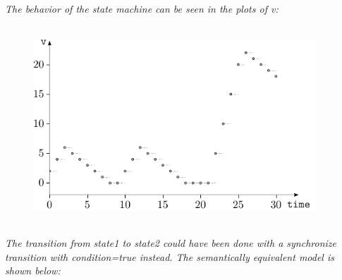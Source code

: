 \documentclass[10pt,a4paper]{report}
\begin{document}
\emph{The behavior of the state machine can be seen in the plots of v:}
\begin{figure}
\includegraphics[width=4.16667in,height=2.91667in]{media/statemachineplot}
\end{figure}
\emph{The transition from state1 to state2 could have been done with a
synchronize transition with condition=true instead. The semantically
equivalent model is shown below:}
\end{document}
